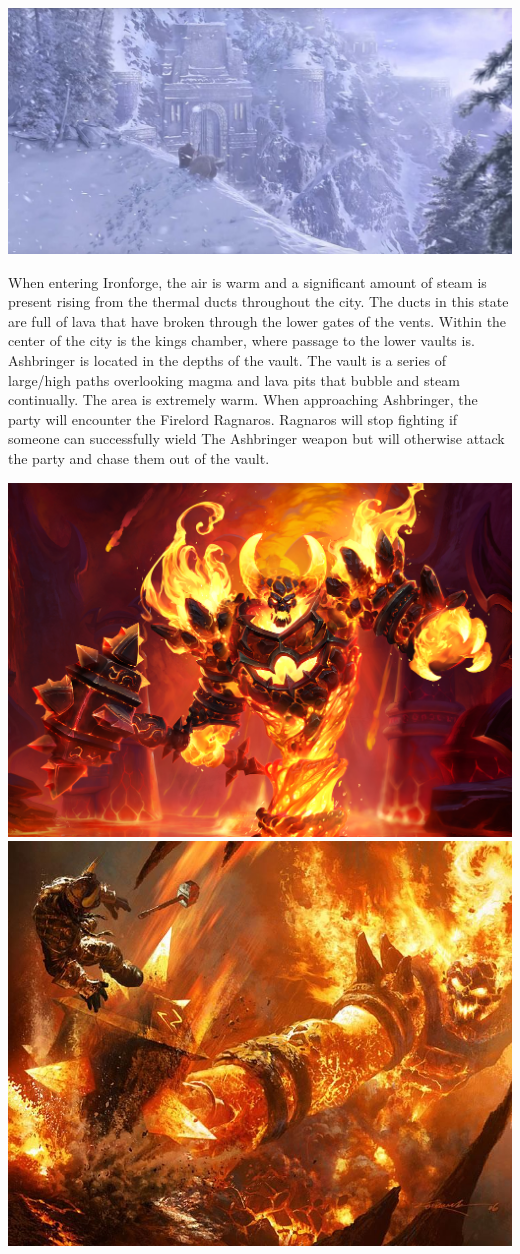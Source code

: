 \begin{center}
	\includegraphics[width=\linewidth]{img/WoW/1200px-Ironforge_-_Classic_cinematic.jpg}
\end{center}

When entering Ironforge, the air is warm and a significant amount of steam is present rising from the thermal ducts throughout the city. The ducts in this state are full of lava that have broken through the lower gates of the vents. Within the center of the city is the kings chamber, where passage to the lower vaults is. Ashbringer is located in the depths of the vault. The vault is a series of large/high paths overlooking magma and lava pits that bubble and steam continually. The area is extremely warm. When approaching Ashbringer, the party will encounter the Firelord Ragnaros. Ragnaros will stop fighting if someone can successfully wield The Ashbringer weapon but will otherwise attack the party and chase them out of the vault.

\begin{center}
	\includegraphics[width=0.515\linewidth]{img/WoW/ragnaros-1920x1200-heroes-of-the-storm-5781.jpg} 	\includegraphics[width=0.45\linewidth]{img/WoW/b9e0808495e9cf3dcbbecedf3e4d5e32.jpg}
\end{center}

